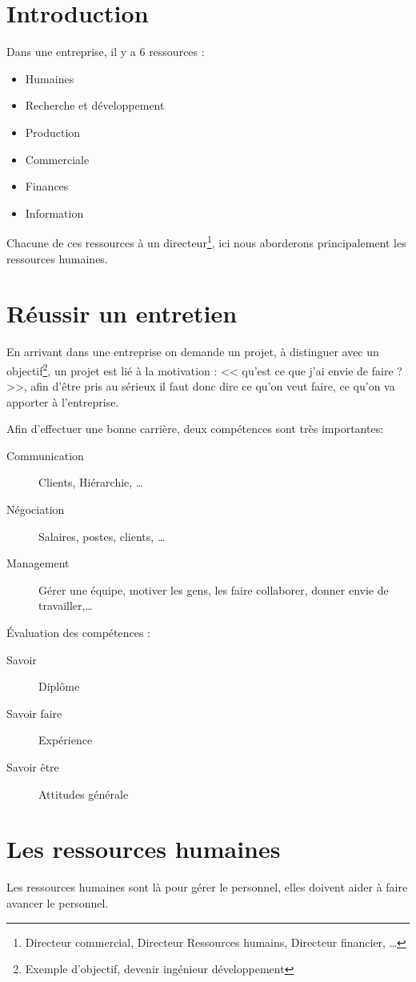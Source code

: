 	\chapter*{Introduction}
	Dans une entreprise, il y a 6 ressources : 
	\begin{itemize}
		\item Humaines
		\item Recherche et développement
		\item Production 
		\item Commerciale
		\item Finances 
		\item Information
	\end{itemize}

	Chacune de ces ressources à un directeur\footnote{Directeur commercial, Directeur
	Ressources humains, Directeur financier, \ldots}, ici nous aborderons principalement
	les ressources humaines.
	
	\chapter{Réussir un entretien}

	En arrivant dans une entreprise on demande un projet, à distinguer avec un
	objectif\footnote{Exemple d'objectif, devenir ingénieur développement}, un projet est
	lié à la motivation : << qu'est ce que j'ai envie de faire ? >>, afin d'être pris au
	sérieux il faut donc dire ce qu'on veut faire, ce qu'on va apporter à
	l'entreprise.

	Afin d'effectuer une bonne carrière, deux compétences sont très importantes: 
	\begin{description}
		\item[Communication] Clients, Hiérarchie, \ldots
		\item[Négociation] Salaires, postes, clients, \ldots
		\item[Management] Gérer une équipe, motiver les gens, les faire collaborer, donner envie de travailler,\ldots
	\end{description}

	Évaluation des compétences : 
	\begin{description}
		\item[Savoir] Diplôme
		\item[Savoir faire] Expérience
		\item[Savoir être] Attitudes générale
	\end{description}

	\chapter{Les ressources humaines}
	Les ressources humaines sont là pour gérer le personnel, elles doivent aider à faire avancer le personnel.

